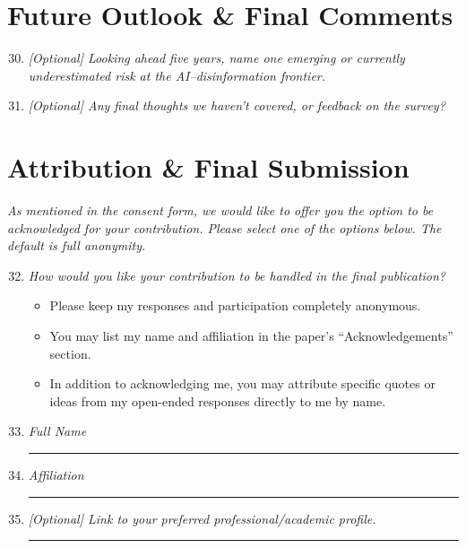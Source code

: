 \section*{Future Outlook \& Final Comments}

\begin{enumerate}[label=\textbf{Q\arabic*.}, leftmargin=3em]
\setcounter{enumi}{29}

    \item \textit{[Optional] Looking ahead five years, name one emerging or currently underestimated risk at the AI--disinformation frontier.}\\[2pt]
    \framebox[\linewidth]{\rule{0pt}{2em}}

    \item \textit{[Optional] Any final thoughts we haven't covered, or feedback on the survey?}\\[2pt]
    \framebox[\linewidth]{\rule{0pt}{2em}}

\end{enumerate}

\section*{Attribution \& Final Submission}

\noindent\textit{As mentioned in the consent form, we would like to offer you the option to be acknowledged for your contribution. Please select one of the options below. The default is full anonymity.}

\begin{enumerate}[label=\textbf{Q\arabic*.}, leftmargin=3em]
\setcounter{enumi}{31}

    \item[*] \textit{How would you like your contribution to be handled in the final publication?}
    \begin{itemize}
        \item[$\bigcirc$] Please keep my responses and participation completely anonymous.
        \item[$\bigcirc$] You may list my name and affiliation in the paper's ``Acknowledgements'' section.
        \item[$\bigcirc$] In addition to acknowledging me, you may attribute specific quotes or ideas from my open-ended responses directly to me by name.
    \end{itemize}

    \item[*] \textit{Full Name} \quad \rule{8cm}{0.4pt}

    \item[*] \textit{Affiliation} \quad \rule{8cm}{0.4pt}

    \item \textit{[Optional] Link to your preferred professional/academic profile.} \quad \rule{6cm}{0.4pt}

\end{enumerate}
